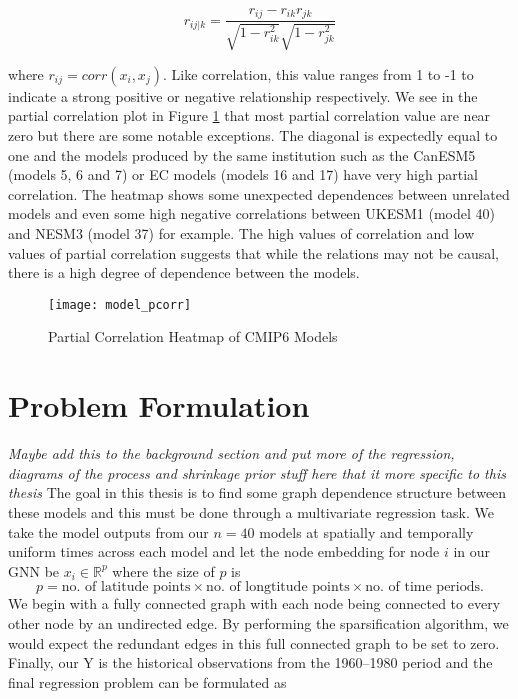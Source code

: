 \documentclass[honours,12pt]{unswthesis}
\newcommand{\R}{\mathbb{R}}
\numberwithin{equation}{section}
\begin{document}
\begin{equation}
    r_{ij|k} = \frac{r_{ij} - r_{ik}r_{jk}}{\sqrt{1-r^2_{ik}} \sqrt{1-r^2_{jk}}}
\end{equation}

{\noindent}where $r_{ij} = corr(x_i, x_j)$. Like correlation, this value ranges from 1 to -1 to indicate a strong positive or negative relationship respectively.
We see in the partial correlation plot in Figure \ref{fig:pcorr_plot} that most partial correlation value are near zero but there are some notable exceptions.
The diagonal is expectedly equal to one and the models produced by the same institution such as the CanESM5 (models 5, 6 and 7) or EC models (models 16 and 17) have very high partial correlation.
The heatmap shows some unexpected dependences between unrelated models and even some high negative correlations between UKESM1 (model 40) and NESM3 (model 37) for example.
The high values of correlation and low values of partial correlation suggests that while the relations may not be causal, there is a high degree of dependence between the models.

\begin{figure}[H]
    \centering
    \texttt{[image: model\_pcorr]}
    \caption{Partial Correlation Heatmap of CMIP6 Models}
\label{fig:pcorr_plot}
\end{figure} 


{\section{Problem Formulation}}\label{problem-formulation}
\textit{Maybe add this to the background section and put more of the regression, diagrams of the process and shrinkage prior stuff here that it more specific to this thesis}
{\noindent}The goal in this thesis is to find some graph dependence structure between these models and this must be done through a multivariate regression task.
We take the model outputs from our $n = 40$ models at spatially and temporally uniform times across each model and let the node embedding for node $i$ in our GNN be $x_i \in \R^{p}$ 
where the size of $p$ is \[p = \text{no. of latitude points} \times \text{no. of longtitude points} \times \text{no. of time periods}.\]
We begin with a fully connected graph with each node being connected to every other node by an undirected edge.
By performing the sparsification algorithm, we would expect the redundant edges in this full connected graph to be set to zero. 
Finally, our Y is the historical observations from the 1960--1980 period and the final regression problem can be formulated as
\end{document}
